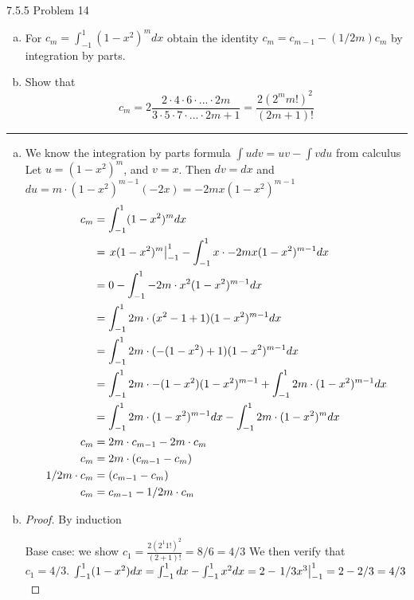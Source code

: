 \documentclass[11pt]{article}
\begin{document}
 7.5.5 Problem 14

\begin{enumerate}[(a)]
    \item For $c_m = \int_{-1} ^1 (1-x^2)^m dx$ obtain the identity $c_m = c_{m-1} - (1/2m)c_m$ 
    by integration by parts.
    \item Show that 
    $$c_m = 2 \frac{2 \cdot 4 \cdot 6 \cdot ... \cdot 2m}{3 \cdot 5 \cdot 7 \cdot ... \cdot 2m +1} = \frac{2(2^mm!)^2}{(2m +1)!}$$
    
\end{enumerate}

\hrule

\begin{enumerate}[(a)]

    \item We know the integration by parts formula $\int u dv = uv - \int v du$ from calculus
    Let $u = (1-x^2)^m$, and $v = x$. Then $dv = dx$ and $du = m \cdot (1 - x^2)^{m-1} (-2x) = -2mx(1 - x^2)^{m-1}$
    \begin{align*}
        c_m &= \int_{-1} ^1 (1-x^2)^m dx\\
        &= \left.x(1-x^2)^m\right\rvert_{-1}^{1} - \int_{-1} ^1 x \cdot -2mx(1 - x^2)^{m-1} dx \\
        &= 0 - \int_{-1} ^1 -2m \cdot x^2(1 - x^2)^{m-1} dx \\
        &= \int_{-1} ^1 2m \cdot (x^2 -1 +1)(1 - x^2)^{m-1} dx \\
        &= \int_{-1} ^1 2m \cdot (-(1- x^2) +1)(1 - x^2)^{m-1} dx \\
        &= \int_{-1} ^1 2m \cdot -(1- x^2)(1 - x^2)^{m-1} + \int_{-1} ^1 2m \cdot (1 - x^2)^{m-1}dx \\
        &= \int_{-1} ^1 2m \cdot (1 - x^2)^{m-1}dx - \int_{-1} ^1 2m \cdot (1 - x^2)^{m} dx\\
        c_m &= 2m \cdot c_{m-1} - 2m \cdot c_m\\
        c_m &= 2m \cdot (c_{m-1} - c_m)\\
        1/2m \cdot c_m &= (c_{m-1} - c_m)\\
        c_m &= c_{m-1} - 1/2m \cdot c_m
    \end{align*}

    \item 

    \begin{proof} By induction
        
        Base case: we show $c_1 = \frac{2(2^1 1!)^2}{(2+1)!} = 8/6 = 4/3$
        We then verify that \\
        $c_1 = 4/3$. $\int_{-1} ^1 (1 - x^2) dx = \int_{-1} ^1 dx - \int_{-1} ^1 x^2 dx = 2 - \left.1/3 x^3\right\rvert_{-1}^{1} = 2 - 2/3 = 4/3$


\end{proof}
\end{enumerate}
\end{document}
